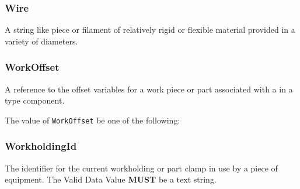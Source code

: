 \FloatBarrier

\subsubsection{Wire}




A string like piece or filament of relatively rigid or flexible material provided in a variety of diameters.


\subsubsection{WorkOffset}
\label{sec:WorkOffset}



A reference to the offset variables for a work piece or part associated with a  in a  type component.


The value of \texttt{WorkOffset} \MUST be one of the following: 

\FloatBarrier

\subsubsection{WorkholdingId}
\label{sec:WorkholdingId}



The identifier for the current workholding or part clamp in use by a piece of equipment. 
 The \gls{Valid Data Value} \textbf{MUST} be a text string.

